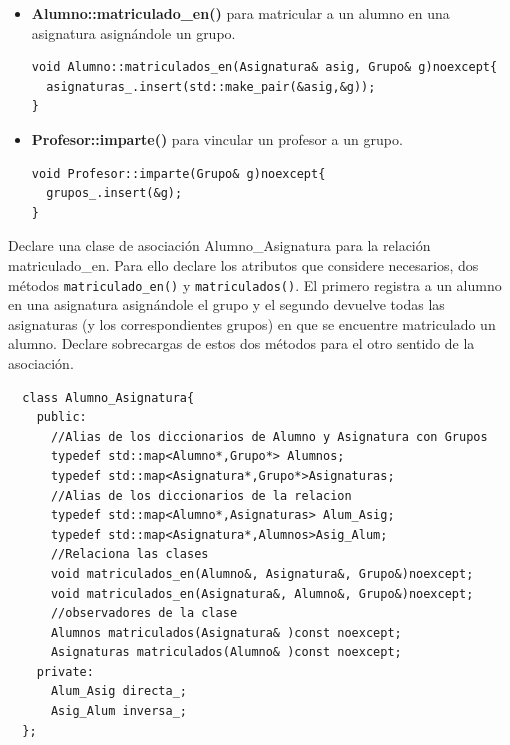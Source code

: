 \begin{itemize}
  \item \textbf{Alumno::matriculado\_en()} para matricular a un alumno en una asignatura asignándole un grupo.
\begin{verbatim}
void Alumno::matriculados_en(Asignatura& asig, Grupo& g)noexcept{
  asignaturas_.insert(std::make_pair(&asig,&g));
}
\end{verbatim}
  \item \textbf{Profesor::imparte()} para vincular un profesor a un grupo.
\begin{verbatim}
void Profesor::imparte(Grupo& g)noexcept{
  grupos_.insert(&g);
}
\end{verbatim}
\end{itemize}
\newpage
{} Declare una clase de asociación Alumno\_Asignatura para la relación matriculado\_en. Para ello declare los atributos que considere necesarios, dos métodos \texttt{matriculado\_en()} y \texttt{matriculados()}. El primero registra a un alumno en una asignatura asignándole el grupo y el segundo devuelve todas las asignaturas (y los correspondientes grupos) en que se encuentre matriculado un alumno. Declare sobrecargas de estos dos métodos para el otro sentido de la asociación.
\begin{verbatim}
  class Alumno_Asignatura{
    public:
      //Alias de los diccionarios de Alumno y Asignatura con Grupos
      typedef std::map<Alumno*,Grupo*> Alumnos;
      typedef std::map<Asignatura*,Grupo*>Asignaturas;
      //Alias de los diccionarios de la relacion
      typedef std::map<Alumno*,Asignaturas> Alum_Asig;
      typedef std::map<Asignatura*,Alumnos>Asig_Alum;
      //Relaciona las clases
      void matriculados_en(Alumno&, Asignatura&, Grupo&)noexcept;
      void matriculados_en(Asignatura&, Alumno&, Grupo&)noexcept;
      //observadores de la clase
      Alumnos matriculados(Asignatura& )const noexcept;
      Asignaturas matriculados(Alumno& )const noexcept;
    private:
      Alum_Asig directa_;
      Asig_Alum inversa_;
  };



\end{verbatim}


